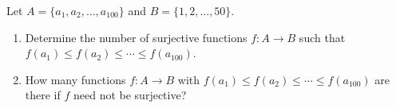 Let $A=\{a_1,a_2,\dots,a_{100}\}$ and $B=\{1,2,\dots,50\}$.
\begin{enumerate}
\item[(a)] Determine the number of surjective functions $f:A\to B$ such that $f(a_1)\le f(a_2)\le\cdots\le f(a_{100})$.
\item[(b)] How many functions $f:A\to B$ with $f(a_1)\le f(a_2)\le\cdots\le f(a_{100})$ are there if $f$ need not be surjective?
\end{enumerate}
